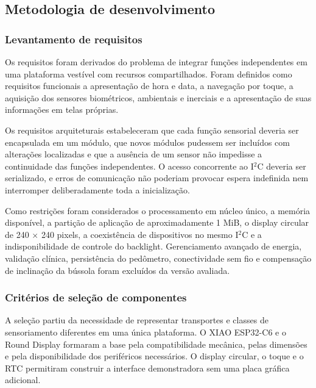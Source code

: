 \documentclass[a4paper,12pt]{article}
\begin{document}
\subsection{Metodologia de desenvolvimento}


\subsubsection{Levantamento de requisitos}


Os requisitos foram derivados do problema de integrar fun\c{c}\~oes independentes em uma plataforma vest\'ivel com recursos compartilhados. Foram definidos como requisitos funcionais a apresenta\c{c}\~ao de hora e data, a navega\c{c}\~ao por toque, a aquisi\c{c}\~ao dos sensores biom\'etricos, ambientais e inerciais e a apresenta\c{c}\~ao de suas informa\c{c}\~oes em telas pr\'oprias.


Os requisitos arquiteturais estabeleceram que cada fun\c{c}\~ao sensorial deveria ser encapsulada em um m\'odulo, que novos m\'odulos pudessem ser inclu\'idos com altera\c{c}\~oes localizadas e que a aus\^encia de um sensor n\~ao impedisse a continuidade das fun\c{c}\~oes independentes. O acesso concorrente ao I$^2$C deveria ser serializado, e erros de comunica\c{c}\~ao n\~ao poderiam provocar espera indefinida nem interromper deliberadamente toda a inicializa\c{c}\~ao.


Como restri\c{c}\~oes foram considerados o processamento em n\'ucleo \'unico, a mem\'oria dispon\'ivel, a parti\c{c}\~ao de aplica\c{c}\~ao de aproximadamente 1 MiB, o display circular de 240 $\times$ 240 pixels, a coexist\^encia de dispositivos no mesmo I$^2$C e a indisponibilidade de controle do backlight. Gerenciamento avan\c{c}ado de energia, valida\c{c}\~ao cl\'inica, persist\^encia do ped\^ometro, conectividade sem fio e compensa\c{c}\~ao de inclina\c{c}\~ao da b\'ussola foram exclu\'idos da vers\~ao avaliada.


\subsubsection{Crit\'erios de sele\c{c}\~ao de componentes}


A sele\c{c}\~ao partiu da necessidade de representar transportes e classes de sensoriamento diferentes em uma \'unica plataforma. O XIAO ESP32-C6 e o Round Display formaram a base pela compatibilidade mec\^anica, pelas dimens\~oes e pela disponibilidade dos perif\'ericos necess\'arios. O display circular, o toque e o RTC permitiram construir a interface demonstradora sem uma placa gr\'afica adicional.
\end{document}
